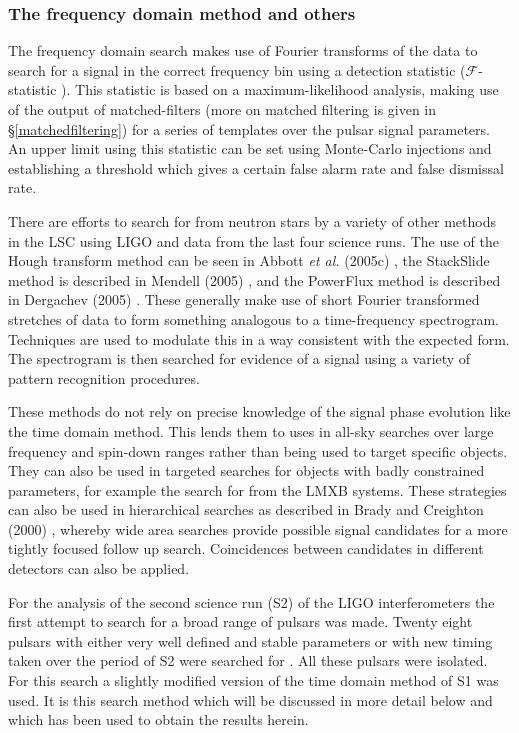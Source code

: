 \subsubsection{The frequency domain method and others}
The frequency domain search makes use of Fourier transforms of the data to search for a signal in
the correct frequency bin using a detection statistic ($\mathcal{F}$-statistic \cite{JKS:1998}).
This statistic is based on a maximum-likelihood analysis, making use of the output of
matched-filters (more on matched filtering is given in \S\ref{matchedfiltering}) for a series of
templates over the pulsar signal parameters. An upper limit using this statistic can be set
using Monte-Carlo injections and establishing a threshold which gives a certain false alarm rate and
false dismissal rate.

There are efforts to search for \gws from neutron stars by a variety of other methods in the LSC
using LIGO and \geo data from the last four science runs. The use of the Hough transform method can
be seen in Abbott {\it et al.} (2005c) \cite{Abbott3:2005}, the StackSlide method is described in
Mendell (2005) \cite{Mendell:2005}, and the PowerFlux method is described in Dergachev (2005)
\cite{Dergachev:2005}. These generally make use of short Fourier transformed stretches of data to
form something analogous to a time-frequency spectrogram. Techniques are used to modulate this in a
way consistent with the expected \gw form. The spectrogram is then searched for evidence of a signal
using a variety of pattern recognition procedures.

These methods do not rely on precise knowledge of the signal phase evolution like the time
domain method. This lends them to uses in all-sky searches over large frequency and spin-down ranges
rather than being used to target specific objects. They can also be used in targeted searches for
objects with badly constrained parameters, for example the search for \gws from the LMXB systems.
These strategies can also be used in hierarchical searches as described in Brady and Creighton
(2000) \cite{BradyCreighton:2000}, whereby wide area searches provide possible signal candidates for
a more tightly focused follow up search. Coincidences between candidates in different detectors can
also be applied.

For the analysis of the second science run (S2) of the LIGO interferometers the first attempt to
search for a broad range of pulsars was made. Twenty eight pulsars with either very well defined and
stable parameters or with new timing taken over the period of S2 were searched for
\cite{Abbott:2005}. All these pulsars were isolated. For this search a slightly modified version of
the time domain method of S1 was used. It is this search method which will be discussed in more
detail below and which has been used to obtain the results herein.

